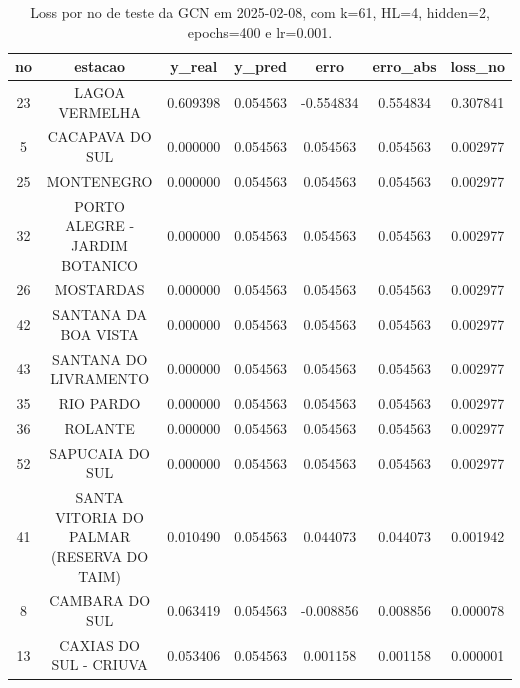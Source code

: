 \begin{table}[h]
\centering
\caption{Loss por no de teste da GCN em 2025-02-08, com k=61, HL=4, hidden=2, epochs=400 e lr=0.001.}
\label{tab:gcn_loss_k61_hl4_h2_e400_d20250208}
\begin{tabular}{ccccccc}
\toprule
no & estacao & y\_real & y\_pred & erro & erro\_abs & loss\_no \\
\midrule
23 & LAGOA VERMELHA & 0.609398 & 0.054563 & -0.554834 & 0.554834 & 0.307841 \\
5 & CACAPAVA DO SUL & 0.000000 & 0.054563 & 0.054563 & 0.054563 & 0.002977 \\
25 & MONTENEGRO & 0.000000 & 0.054563 & 0.054563 & 0.054563 & 0.002977 \\
32 & PORTO ALEGRE - JARDIM BOTANICO & 0.000000 & 0.054563 & 0.054563 & 0.054563 & 0.002977 \\
26 & MOSTARDAS & 0.000000 & 0.054563 & 0.054563 & 0.054563 & 0.002977 \\
42 & SANTANA DA BOA VISTA & 0.000000 & 0.054563 & 0.054563 & 0.054563 & 0.002977 \\
43 & SANTANA DO LIVRAMENTO & 0.000000 & 0.054563 & 0.054563 & 0.054563 & 0.002977 \\
35 & RIO PARDO & 0.000000 & 0.054563 & 0.054563 & 0.054563 & 0.002977 \\
36 & ROLANTE & 0.000000 & 0.054563 & 0.054563 & 0.054563 & 0.002977 \\
52 & SAPUCAIA DO SUL & 0.000000 & 0.054563 & 0.054563 & 0.054563 & 0.002977 \\
41 & SANTA VITORIA DO PALMAR (RESERVA DO TAIM) & 0.010490 & 0.054563 & 0.044073 & 0.044073 & 0.001942 \\
8 & CAMBARA DO SUL & 0.063419 & 0.054563 & -0.008856 & 0.008856 & 0.000078 \\
13 & CAXIAS DO SUL - CRIUVA & 0.053406 & 0.054563 & 0.001158 & 0.001158 & 0.000001 \\
\bottomrule
\end{tabular}
\end{table}
